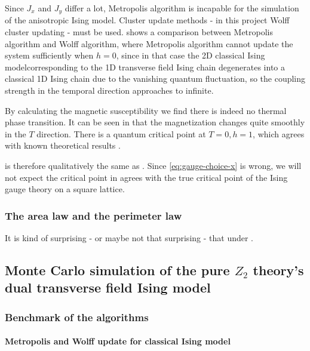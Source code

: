\documentclass[hyperref, a4paper]{article}
\newcommand*{\Ztwo}{$\mathbb{Z}_2$ }
\newcommand*{\cim}{classical Ising model}
\def\mathbb#1{#1}%
\begin{document}
Since $J_x$ and $J_y$ differ a lot, Metropolis algorithm is incapable for the simulation of the anisotropic Ising model.
Cluster update methods - in this project Wolff cluster updating \cite{Wolff_1989} - must be used.
 shows a comparison between Metropolis algorithm and Wolff algorithm, 
where Metropolis algorithm cannot update the system sufficiently when $h=0$, 
since in that case the 2D \cim corresponding to the 1D transverse field Ising chain degenerates into a classical 1D Ising chain due to the vanishing quantum fluctuation, 
so the coupling strength in the temporal direction approaches to infinite.

By calculating the magnetic susceptibility we find there is indeed no thermal phase transition.
It can be seen in  that the magnetization changes quite smoothly in the $T$ direction.
There is a quantum critical point at $T = 0, h = 1$, which agrees with known theoretical results \cite{sachdev_2011}.

 is therefore qualitatively the same as .
Since \eqref{eq:gauge-choice-x} is wrong, we will not expect the critical point in  agrees with the true critical point of the Ising gauge theory on a square lattice.

\subsubsection{The area law and the perimeter law}

It is kind of surprising - or maybe not that surprising - that under . %

\subsection{Monte Carlo simulation of the pure \Ztwo theory's dual transverse field Ising model}

\subsubsection{Benchmark of the algorithms}

\paragraph{Metropolis and Wolff update for \cim}
\end{document}
